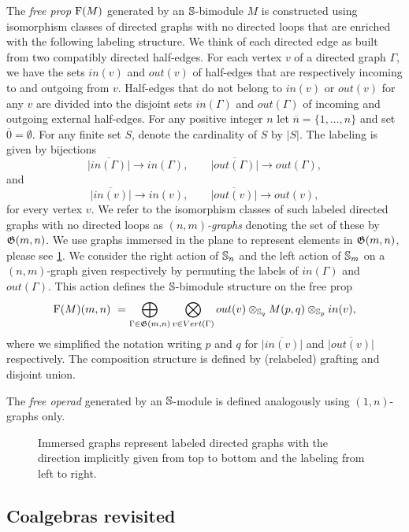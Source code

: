 The \textit{free prop} $\F(M)$ generated by an $\S$-bimodule $M$ is constructed using isomorphism classes of directed graphs with no directed loops that are enriched with the following labeling structure.
We think of each directed edge as built from two compatibly directed half-edges.
For each vertex $v$ of a directed graph $\Gamma$, we have the sets $in(v)$ and $out(v)$ of half-edges that are respectively incoming to and outgoing from $v$.
Half-edges that do not belong to $in(v)$ or $out(v)$ for any $v$ are divided into the disjoint sets $in(\Gamma)$ and $out(\Gamma)$ of incoming and outgoing external half-edges.
For any positive integer $n$ let $\overline{n} = \{1, \dots, n\}$ and set $\overline{0} = \emptyset$.
For any finite set $S$, denote the cardinality of $S$ by $|S|$.
The labeling is given by bijections
\[
\overline{|in(\Gamma)|}\to in(\Gamma), \qquad
\overline{|out(\Gamma)|}\to out(\Gamma),
\]
and
\[
\overline{|in(v)|}\to in(v), \qquad
\overline{|out(v)|}\to out(v),
\]
for every vertex $v$.
We refer to the isomorphism classes of such labeled directed graphs with no directed loops as $(n,m)$\textit{-graphs} denoting the set of these by $\graphs(m,n)$.
We use graphs immersed in the plane to represent elements in $\graphs(m,n)$, please see \cref{f:immersion}.
We consider the right action of $\S_n$ and the left action of $\S_m$ on a $(n,m)$-graph given respectively by permuting the labels of $in(\Gamma)$ and $out(\Gamma)$.
This action defines the $\S$-bimodule structure on the free prop
\begin{equation} \label{e:free prop}
\F(M)(m,n) \ = \bigoplus_{\Gamma \in \graphs(m,n)} \bigotimes_{v \in Vert(\Gamma)} out(v) \otimes_{\S_q} M(p, q) \otimes_{\S_p} in(v),
\end{equation}
where we simplified the notation writing $p$ and $q$ for $\overline{|in(v)|}$ and $\overline{|out(v)|}$ respectively.
The composition structure is defined by (relabeled) grafting and disjoint union.

The \textit{free operad} generated by an $\S$-module is defined analogously using $(1,n)$-graphs only.

\begin{figure}
	
	\caption{Immersed graphs represent labeled directed graphs with the direction implicitly given from top to bottom and the labeling from left to right.}
	\label{f:immersion}
\end{figure}

\subsection{Coalgebras revisited}

